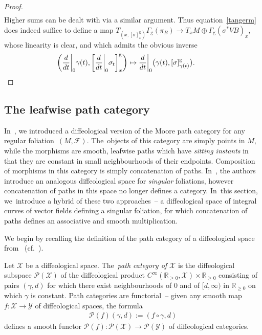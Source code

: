 \documentclass[11pt]{article}
\numberwithin{equation}{section}
\numberwithin{equation}{section}
\def\g{\operatorname{g}}
\def\FF{{\mathcal{F}}}
\def\PP{{\mathcal{P}}}
\def\YY{{\mathcal{Y}}}
\def\XX{{\mathcal{X}}}
\def\RB{{\mathbb{R}}}
\begin{document}
\begin{proof}
\begin{gather*}
\end{gather*}
Higher sums can be dealt with via a similar argument. Thus equation~\eqref{tangerm} does indeed suffice to define a map $T_{\left(x,[\sigma]^{\g}_{x}\right)}\Gamma_{\g}(\pi_{B})\rightarrow T_{x}M\oplus\Gamma_{\g}(\sigma^{*}VB)_{x}$, whose linearity is clear, and which admits the obvious inverse
\begin{gather*}
\bigg(\frac{\rm d}{{\rm d}t}\bigg|_{0}\gamma(t),\bigg[\frac{\rm d}{{\rm d}t}\bigg|_{0}\sigma_{t}\bigg]^{\g}_{x}\bigg)\mapsto \frac{\rm d}{{\rm d}t}\bigg|_{0}\big(\gamma(t),[\sigma]^{\g}_{\gamma(t)}\big).\tag*{\qed}
\end{gather*}
\renewcommand{\qed}{}
\end{proof}

\setcounter{subsection}{2}\setcounter{Theorem}{13}
\subsection{The leafwise path category}

In~\cite{mac3}, we introduced a diffeological version of the Moore path category for any regular folia\-tion~$(M,\FF)$. The~objects of this category are simply points in $M$, while the morphisms are smooth, leafwise paths which have \textit{sitting instants} in that they are constant in small neighbourhoods of their endpoints. Composition of morphisms in this category is simply concatenation of paths. In~\cite{VilGar1}, the authors introduce an analogous diffeological space for \textit{singular} foliations, however concatenation of paths in this space no longer defines a category. In~this section, we~intro\-duce a hybrid of these two approaches~-- a diffeological space of integral curves of vector fields defining a singular foliation, for which concatenation of paths defines an associative and smooth multiplication.

We begin by recalling the definition of the path category of a diffeological space from~\cite{mac3} (cf.~\cite{ptfunctor}).

\begin{Definition}%
Let $\XX$ be a diffeological space. The~\textit{path category of $\XX$} is the diffeological sub\-space $\PP(\XX)$ of the diffeological product $C^{\infty}(\RB_{\geq0},\XX)\times\RB_{\geq0}$ consisting of pairs $(\gamma,d)$ for which there exist neighbourhoods of $0$ and of $[d,\infty)$ in $\RB_{\geq0}$ on which $\gamma$ is constant. Path categories are functorial~-- given any smooth map $f\colon \XX\rightarrow \YY$ of diffeological spaces, the formula
\begin{gather*}
\PP(f)(\gamma,d):=(f\circ\gamma,d)
\end{gather*}
defines a smooth functor $\PP(f)\colon \PP(\XX)\rightarrow \PP(\YY)$ of diffeological categories.
\end{Definition}
\end{document}
